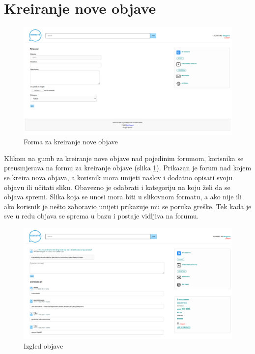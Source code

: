 \documentclass{foi}
\begin{document}
\section{Kreiranje nove objave}

\begin{figure}[h!]
    \centering
    \includegraphics[width=1\textwidth]{slike/nova-objava.png}
    \caption{Forma za kreiranje nove objave}
    \label{nova-objava}
\end{figure}

Klikom na gumb za kreiranje nove objave nad pojedinim forumom, korisnika se preusmjerava na formu za kreiranje objave (slika \ref{nova-objava}). Prikazan je forum nad kojem se kreira nova objava, a korisnik mora unijeti naslov i dodatno opisati svoju objavu ili učitati sliku. Obavezno je odabrati i kategoriju na koju želi da se objava spremi. Slika koja se unosi mora biti u slikovnom formatu, a ako nije ili ako korisnik je nešto zaboravio unijeti prikazuje mu se poruka greške. Tek kada je sve u redu objava se sprema u bazu i postaje vidljiva na forumu.

\begin{figure}[h!]
    \centering
    \includegraphics[width=1\textwidth]{slike/objava.png}
    \caption{Izgled objave}
    \label{objava}
\end{figure}
\end{document}
